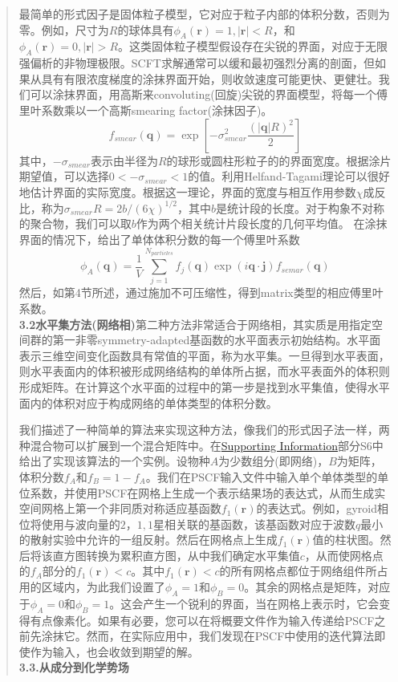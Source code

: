 \documentclass{article}
\begin{document}
\begin{CJK}{UTF8}{gkai}
\begin{quotation}
最简单的形式因子是固体粒子模型，它对应于粒子内部的体积分数，否则为零。例如，尺寸为$R$的球体具有$\phi _{A}(\mathbf{r})=1,|\mathbf{r}|<R$，和$\phi _{A}(\mathbf{r})=0,|\mathbf{r}|>R$。这类固体粒子模型假设存在尖锐的界面，对应于无限强偏析的非物理极限。SCFT求解通常可以缓和最初强烈分离的剖面，但如果从具有有限浓度梯度的涂抹界面开始，则收敛速度可能更快、更健壮。我们可以涂抹界面，用高斯来convoluting(回旋)尖锐的界面模型，将每一个傅里叶系数乘以一个高斯smearing factor(涂抹因子)。
\begin{equation}\label{14}
f_{smear}(\mathbf{q})=\exp \left[ -\sigma _{smear}^2 \frac{(|\mathbf{q}|R)^2}{2} \right]
\end{equation}
其中，$-\sigma _{smear}$表示由半径为$R$的球形或圆柱形粒子的的界面宽度。根据涂片期望值，可以选择$0<-\sigma _{smear}<1$的值。利用Helfand-Tagami理论可以很好地估计界面的实际宽度。根据这一理论，界面的宽度与相互作用参数$\chi$成反比，称为$\sigma _{smear} R=2b/(6 \chi)^{1/2}$，其中$b$是统计段的长度。对于构象不对称的聚合物，我们可以取$b$作为两个相关统计片段长度的几何平均值。
在涂抹界面的情况下，给出了单体体积分数的每一个傅里叶系数
\begin{equation}\label{15}
\phi _A(\mathbf{q})=\frac{1}{V}\sum _{j=1}^{N_{particles}} f_j(\mathbf{q})\exp (i \mathbf{q \cdot \mathbf{j}}) f_{semar}(\mathbf{q})
\end{equation}
然后，如第4节所述，通过施加不可压缩性，得到matrix类型的相应傅里叶系数。\\
\textbf{3.2水平集方法(网络相)}第二种方法非常适合于网络相，其实质是用指定空间群的第一非零symmetry-adapted基函数的水平面表示初始结构。水平面表示三维空间变化函数具有常值的平面，称为水平集。一旦得到水平表面，则水平表面内的体积被形成网络结构的单体所占据，而水平表面外的体积则形成矩阵。在计算这个水平面的过程中的第一步是找到水平集值，使得水平面内的体积对应于构成网络的单体类型的体积分数。

我们描述了一种简单的算法来实现这种方法，像我们的形式因子法一样，两种混合物可以扩展到一个混合矩阵中。在\href{http://pubs.acs.org/doi/suppl/10.1021/acs.macromol.6b00107/suppl_file/ma6b00107_si_001.pdf}{Supporting Information}部分S6中给出了实现该算法的一个实例。设物种$A$为少数组分(即网络)，$B$为矩阵，体积分数$f_A$和$f_B=1-f_A$。我们在PSCF输入文件中输入单个单体类型的单位系数，并使用PSCF在网格上生成一个表示结果场的表达式，从而生成实空间网格上第一个非同质对称适应基函数$f_1(\mathbf{r})$的表达式。例如，gyroid相位将使用与波向量的${2，1,1}$星相关联的基函数，该基函数对应于波数$q$最小的散射实验中允许的一组反射。然后在网格点上生成$f_1(\mathbf{r})$值的柱状图。然后将该直方图转换为累积直方图，从中我们确定水平集值$c$，从而使网格点的$f_A$部分的$f_1(\mathbf{r})<c$。其中$f_1(\mathbf{r})<c$的所有网格点都位于网络组件所占用的区域内，为此我们设置了$\phi _A=1$和$\phi _B=0$。其余的网格点是矩阵，对应于$\phi _A=0$和$\phi _B=1$。这会产生一个锐利的界面，当在网格上表示时，它会变得有点像素化。如果有必要，您可以在将概要文件作为输入传递给PSCF之前先涂抹它。然而，在实际应用中，我们发现在PSCF中使用的迭代算法即使作为输入，也会收敛到期望的解。\\
\textbf{3.3.从成分到化学势场}


\end{quotation}
\end{CJK}
\end{document}
